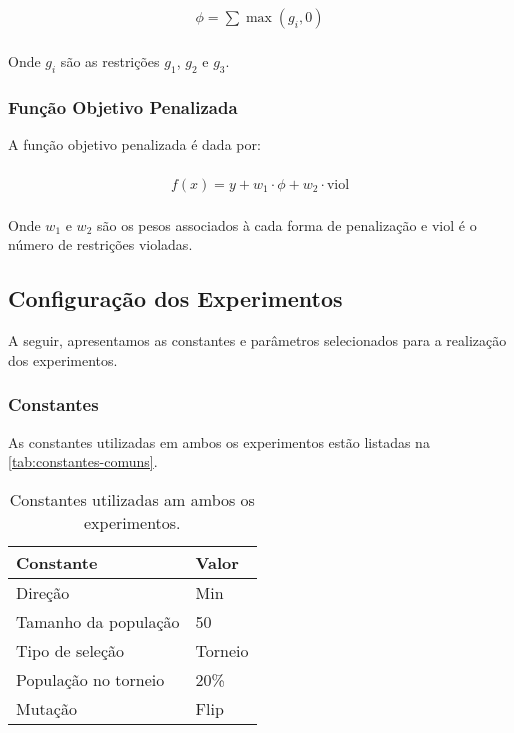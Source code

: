 \begin{gather}
    \begin{align}
        \begin{split}
            \phi = \sum \max(g_i, 0)
        \end{split}
    \end{align}
\end{gather}

Onde \(g_i\) são as restrições \(g_1\), \(g_2\) e \(g_3\).

\subsubsection{Função Objetivo Penalizada}

A função objetivo penalizada é dada por:

\begin{gather}
    \begin{align}
        \begin{split}
            f(x) = y + w_1 \cdot \phi + w_2 \cdot \text{viol}
        \end{split}
    \end{align}
\end{gather}

Onde \(w_1\) e \(w_2\) são os pesos associados à cada forma de penalização e \(\text{viol}\) é o número de restrições violadas.

\subsection{Configuração dos Experimentos}

A seguir, apresentamos as constantes e parâmetros selecionados para a realização dos experimentos.

\subsubsection{Constantes}

As constantes utilizadas em ambos os experimentos estão listadas na \autoref{tab:constantes-comuns}.

\begin{table}[htb]
    \center%
    \begin{tabular}{l l}
        \bottomrule
        \textbf{Constante}   & \textbf{Valor} \\ \midrule
        Direção              & Min            \\ \midrule
        Tamanho da população & 50             \\ \midrule
        Tipo de seleção      & Torneio        \\ \midrule
        População no torneio & 20\%           \\
        \midrule
        Mutação              & Flip           \\ \midrule
    \end{tabular}
    \caption{Constantes utilizadas am ambos os experimentos.}%
    \label{tab:constantes-comuns}
\end{table}

